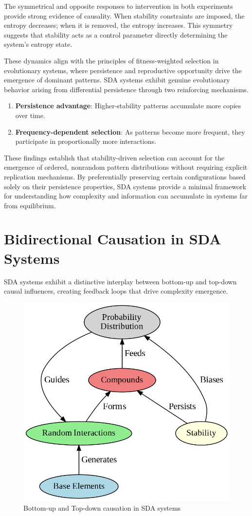 \documentclass[preprint,12pt]{elsarticle}
\begin{document}
The symmetrical and opposite responses to intervention in both experiments provide strong evidence of causality. When stability constraints are imposed, the entropy decreases; when it is removed, the entropy increases. This symmetry suggests that stability acts as a control parameter directly determining the system's entropy state.

These dynamics align with the principles of fitness-weighted selection in evolutionary systems, where persistence and reproductive opportunity drive the emergence of dominant patterns. SDA systems exhibit genuine evolutionary behavior arising from differential persistence through two reinforcing mechanisms.
\begin{enumerate}
    \item \textbf{Persistence advantage}: Higher-stability patterns accumulate more copies over time.
    \item \textbf{Frequency-dependent selection}: As patterns become more frequent, they participate in proportionally more interactions.
\end{enumerate}

These findings establish that stability-driven selection can account for the emergence of ordered, nonrandom pattern distributions without requiring explicit replication mechanisms. By preferentially preserving certain configurations based solely on their persistence properties, SDA systems provide a minimal framework for understanding how complexity and information can accumulate in systems far from equilibrium.


\section{Bidirectional Causation in SDA Systems}

SDA systems exhibit a distinctive interplay between bottom-up and top-down causal influences, creating feedback loops that drive complexity emergence.

\begin{figure}[h]
    \centering
    \includegraphics[width=0.7\linewidth,height=0.7\linewidth]{figure_10.png}
    \caption{Bottom-up and Top-down causation in SDA systems}
    \label{fig:figure_10}
\end{figure}
\end{document}
